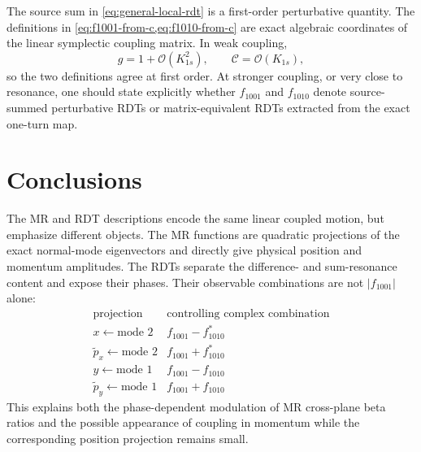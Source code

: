 \documentclass[11pt,a4paper]{article}
\begin{document}
The source sum in \cref{eq:general-local-rdt} is a first-order perturbative quantity.  The definitions in \cref{eq:f1001-from-c,eq:f1010-from-c} are exact algebraic coordinates of the linear symplectic coupling matrix.  In weak coupling,
\begin{equation}
 g=1+\mathcal O(K_{1s}^2),
 \qquad
 \mathcal C=\mathcal O(K_{1s}),
\end{equation}
so the two definitions agree at first order.  At stronger coupling, or very close to resonance, one should state explicitly whether $f_{1001}$ and $f_{1010}$ denote source-summed perturbative RDTs or matrix-equivalent RDTs extracted from the exact one-turn map.

\section{Conclusions}

The MR and RDT descriptions encode the same linear coupled motion, but emphasize different objects.  The MR functions are quadratic projections of the exact normal-mode eigenvectors and directly give physical position and momentum amplitudes.  The RDTs separate the difference- and sum-resonance content and expose their phases.  Their observable combinations are not $|f_{1001}|$ alone:
\begin{equation}
 \begin{array}{c|c}
 \text{projection}&\text{controlling complex combination}\\ \hline
 x\leftarrow\text{mode 2}&f_{1001}-f_{1010}^{*}\\
 \widetilde p_x\leftarrow\text{mode 2}&f_{1001}+f_{1010}^{*}\\
 y\leftarrow\text{mode 1}&f_{1001}-f_{1010}\\
 \widetilde p_y\leftarrow\text{mode 1}&f_{1001}+f_{1010}
 \end{array}
\end{equation}
This explains both the phase-dependent modulation of MR cross-plane beta ratios and the possible appearance of coupling in momentum while the corresponding position projection remains small.
\end{document}
